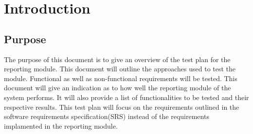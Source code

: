 %
% 	
%  	
% 
% 	
%
\section{Introduction}

\subsection{Purpose}
The purpose of this document is to give an overview of the test plan for the reporting module. This document will outline the approaches used to test the module. Functional as well as non-functional requirements will be tested. This document will give an indication as to how well the reporting module of the system performs. It will also provide a list of functionalities to be tested and their respective results. This test plan will focus on the requirements outlined in the software requirements specification(SRS) instead of the requirements implamented in the reporting module. 
